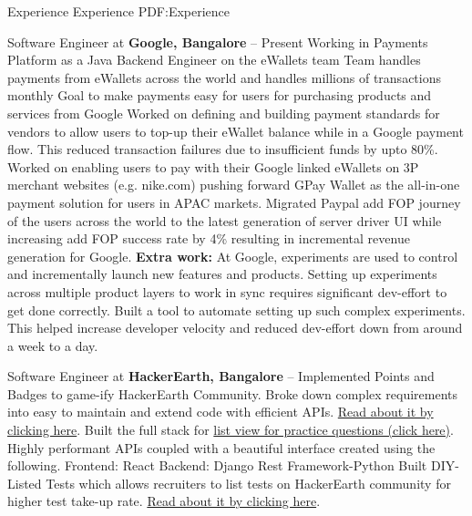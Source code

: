 \documentclass[letterpaper,MMMyyyy,nonstopmode]{simpleresumecv}
\begin{document}
\begin{Body}


\Section
{Experience}
{Experience}
{PDF:Experience}

\Entry
Software Engineer at\textbf{ Google, Bangalore}
\hfill 
{} --
Present
\BulletItem
Working in Payments Platform as a Java Backend Engineer on the eWallets team
\BulletItem
Team handles payments from eWallets across the world and handles millions of transactions monthly
\BulletItem
Goal to make payments easy for users for purchasing products and services from Google
\BulletItem
Worked on defining and building payment standards for vendors to allow users to top-up their eWallet balance while in a Google payment flow. This reduced transaction failures due to insufficient funds by upto 80\%.
\BulletItem
Worked on enabling users to pay with their Google linked eWallets on 3P merchant websites (e.g. nike.com) pushing forward GPay Wallet as the all-in-one payment solution for users in APAC markets.
\BulletItem
Migrated Paypal add FOP journey of the users across the world to the latest generation of server driver UI while increasing add FOP success rate by 4\% resulting in incremental revenue generation for Google.
\BulletItem
\textbf{Extra work:} At Google, experiments are used to control and incrementally launch new features and products. Setting up experiments across multiple product layers to work in sync requires significant dev-effort to get done correctly. Built a tool to automate setting up such complex experiments. This helped increase developer velocity and reduced dev-effort down from around a week to a day. 

\BigGap
\Entry
Software Engineer at\textbf{ HackerEarth, Bangalore}
\hfill 
{} --
\BulletItem
Implemented Points and Badges to game-ify HackerEarth Community. Broke down complex requirements into easy to maintain and extend code with efficient APIs. \href{https://www.hackerearth.com/docs/wiki/developers/points-and-badges-on-hackerearth/}{Read about it by clicking here}.
\BulletItem
Built the full stack for \href{https://www.hackerearth.com/practice/problems/}{list view for practice questions (click here)}. Highly performant APIs coupled with a beautiful interface created using the following. 
\SubBulletItem Frontend: React  
\SubBulletItem Backend: Django Rest Framework-Python
\BulletItem
Built DIY-Listed Tests which allows recruiters to list tests on HackerEarth
community for higher test take-up rate. \href{https://help.hackerearth.com/hc/en-us/articles/4412341460633-Listed- tests}{Read about it by clicking here}. 


\end{Body}
\end{document}
